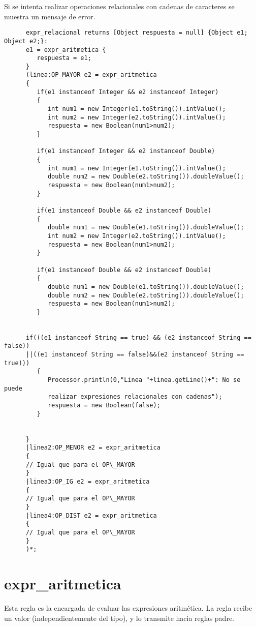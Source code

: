    Si se intenta realizar operaciones relacionales con cadenas de caracteres se muestra un mensaje de error.
   \begin{lstlisting}
      expr_relacional returns [Object respuesta = null] {Object e1; Object e2;}:
      e1 = expr_aritmetica {
         respuesta = e1;
      }
      (linea:OP_MAYOR e2 = expr_aritmetica
      {
         if(e1 instanceof Integer && e2 instanceof Integer)
         {
            int num1 = new Integer(e1.toString()).intValue();
            int num2 = new Integer(e2.toString()).intValue();
            respuesta = new Boolean(num1>num2);
         }
         
         if(e1 instanceof Integer && e2 instanceof Double)
         {
            int num1 = new Integer(e1.toString()).intValue();
            double num2 = new Double(e2.toString()).doubleValue();
            respuesta = new Boolean(num1>num2);
         }
         
         if(e1 instanceof Double && e2 instanceof Double)
         {
            double num1 = new Double(e1.toString()).doubleValue();
            int num2 = new Integer(e2.toString()).intValue();
            respuesta = new Boolean(num1>num2);
         }
         
         if(e1 instanceof Double && e2 instanceof Double)
         {
            double num1 = new Double(e1.toString()).doubleValue();
            double num2 = new Double(e2.toString()).doubleValue();
            respuesta = new Boolean(num1>num2);
         }
         
         
      if(((e1 instanceof String == true) && (e2 instanceof String == false))
      ||((e1 instanceof String == false)&&(e2 instanceof String == true)))
         {
            Processor.println(0,"Linea "+linea.getLine()+": No se puede 
            realizar expresiones relacionales con cadenas");
            respuesta = new Boolean(false);
         }
         
            
      }
      |linea2:OP_MENOR e2 = expr_aritmetica
      {
      // Igual que para el OP\_MAYOR
      } 
      |linea3:OP_IG e2 = expr_aritmetica
      {
      // Igual que para el OP\_MAYOR
      }
      |linea4:OP_DIST e2 = expr_aritmetica
      {
      // Igual que para el OP\_MAYOR
      }
      )*;
   \end{lstlisting}

   \section{expr\_aritmetica}
   Esta regla es la encargada de evaluar las expresiones aritmética. La regla recibe un valor (independientemente del tipo),
   y lo transmite hacia reglas padre.\\


